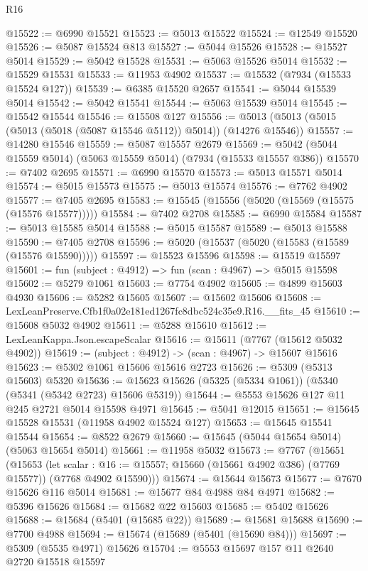 \begin{lexlean}{R16}
\begin{coremodule}
@15522 := @6990 @15521
@15523 := @5013 @15522
@15524 := @12549 @15520
@15526 := @5087 @15524 @813
@15527 := @5044 @15526
@15528 := @15527 @5014
@15529 := @5042 @15528
@15531 := @5063 @15526 @5014
@15532 := @15529 @15531
@15533 := @11953 @4902
@15537 := @15532 (@7934 (@15533 @15524 @127))
@15539 := @6385 @15520 @2657
@15541 := @5044 @15539 @5014
@15542 := @5042 @15541
@15544 := @5063 @15539 @5014
@15545 := @15542 @15544
@15546 := @15508 @127
@15556 := @5013 (@5013 (@5015 (@5013 (@5018 (@5087 @15546 @5112)) @5014)) (@14276 @15546))
@15557 := @14280 @15546
@15559 := @5087 @15557 @2679
@15569 := @5042 (@5044 @15559 @5014) (@5063 @15559 @5014) (@7934 (@15533 @15557 @386))
@15570 := @7402 @2695
@15571 := @6990 @15570
@15573 := @5013 @15571 @5014
@15574 := @5015 @15573
@15575 := @5013 @15574
@15576 := @7762 @4902
@15577 := @7405 @2695
@15583 := @15545 (@15556 (@5020 (@15569 (@15575 (@15576 @15577)))))
@15584 := @7402 @2708
@15585 := @6990 @15584
@15587 := @5013 @15585 @5014
@15588 := @5015 @15587
@15589 := @5013 @15588
@15590 := @7405 @2708
@15596 := @5020 (@15537 (@5020 (@15583 (@15589 (@15576 @15590)))))
@15597 := @15523 @15596
@15598 := @15519 @15597
@15601 := fun (subject : @4912) => fun (scan : @4967) => @5015 @15598
@15602 := @5279 @1061
@15603 := @7754 @4902
@15605 := @4899 @15603 @4930
@15606 := @5282 @15605
@15607 := @15602 @15606
@15608 := LexLeanPreserve.Cfb1f0a02e181ed1267fc8dbc524c35e9.R16.__fits_45
@15610 := @15608 @5032 @4902
@15611 := @5288 @15610
@15612 := LexLeanKappa.Json.escapeScalar
@15616 := @15611 (@7767 (@15612 @5032 @4902))
@15619 := (subject : @4912) -> (scan : @4967) -> @15607 @15616
@15623 := @5302 @1061 @15606 @15616 @2723
@15626 := @5309 (@5313 @15603) @5320
@15636 := @15623 @15626 (@5325 (@5334 @1061)) (@5340 (@5341 (@5342 @2723) @15606 @5319))
@15644 := @5553 @15626 @127 @11 @245 @2721 @5014 @15598 @4971
@15645 := @5041 @12015
@15651 := @15645 @15528 @15531 (@11958 @4902 @15524 @127)
@15653 := @15645 @15541 @15544
@15654 := @8522 @2679
@15660 := @15645 (@5044 @15654 @5014) (@5063 @15654 @5014)
@15661 := @11958 @5032
@15673 := @7767
    (@15651
      (@15653
        (let scalar : @16 := @15557; @15660 (@15661 @4902 @386) (@7769 @15577))
        (@7768 @4902 @15590)))
@15674 := @15644 @15673
@15677 := @7670 @15626 @116 @5014
@15681 := @15677 @84 @4988 @84 @4971
@15682 := @5396 @15626
@15684 := @15682 @22 @15603
@15685 := @5402 @15626
@15688 := @15684 (@5401 (@15685 @22))
@15689 := @15681 @15688
@15690 := @7700 @4988
@15694 := @15674 (@15689 (@5401 (@15690 @84)))
@15697 := @5309 (@5535 @4971) @15626
@15704 := @5553 @15697 @157 @11 @2640 @2720 @15518 @15597

\end{coremodule}
\end{lexlean}
